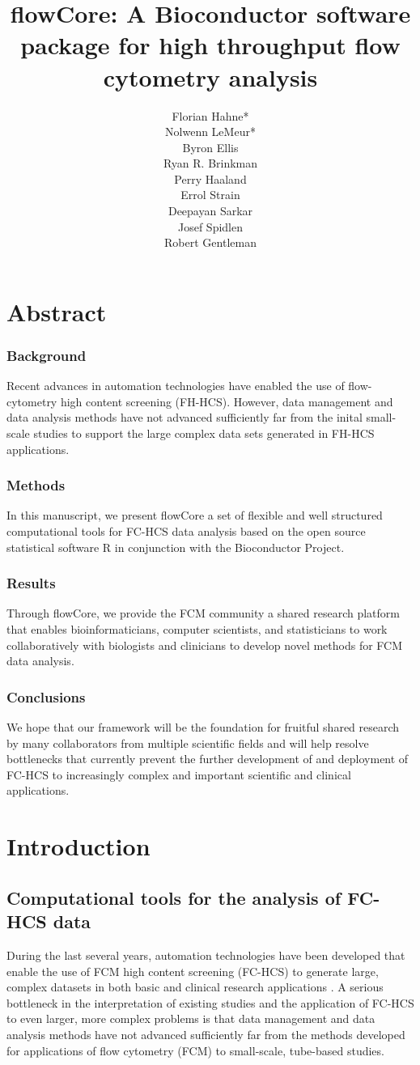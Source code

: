 \documentclass[12pt]{article}
\title{flowCore: A Bioconductor software package for high throughput flow cytometry analysis}
\author{Florian Hahne*\\
  Nolwenn LeMeur*\\
  Byron Ellis\\
  Ryan R. Brinkman\\
  Perry Haaland\\
  Errol Strain\\
  Deepayan Sarkar\\
  Josef Spidlen\\
  Robert Gentleman
 }
\newcommand{\Rpackage}[1]{{\textsf{#1}}}
\begin{document}
\maketitle

\section*{Abstract}
\subsubsection*{Background}
Recent advances in automation technologies have enabled the use of
flow-cytometry high content screening (FH-HCS). However, data
management and data analysis methods have not advanced sufficiently
far from the inital small-scale studies to support the large complex
data sets generated in FH-HCS applications.
\subsubsection*{Methods}
In this manuscript, we present \Rpackage{flowCore} a set of flexible
and well structured computational tools for FC-HCS data analysis based
on the open source statistical software R in conjunction with the
Bioconductor Project.
\subsubsection*{Results}
Through \Rpackage{flowCore}, we provide the FCM community a shared
research platform that enables bioinformaticians, computer scientists,
and statisticians to work collaboratively with biologists and
clinicians to develop novel methods for FCM data analysis.
\subsubsection*{Conclusions}
We hope that our framework will be the foundation for fruitful shared
research by many collaborators from multiple scientific fields and
will help resolve bottlenecks that currently prevent the further
development of and deployment of FC-HCS to increasingly complex and
important scientific and clinical applications.

\section*{Introduction}
\subsection*{Computational tools for the analysis of FC-HCS data}
During the last several years, automation technologies have been
developed that enable the use of FCM high content screening
(FC-HCS) to generate large, complex datasets in both basic and
clinical research applications \citep{brinkman2007hcf}. A serious
bottleneck in the interpretation of existing studies and the
application of FC-HCS to even larger, more complex problems is that
data management and data analysis methods have not advanced
sufficiently far from the methods developed for applications of flow
cytometry (FCM) to small-scale, tube-based studies.
\end{document}
